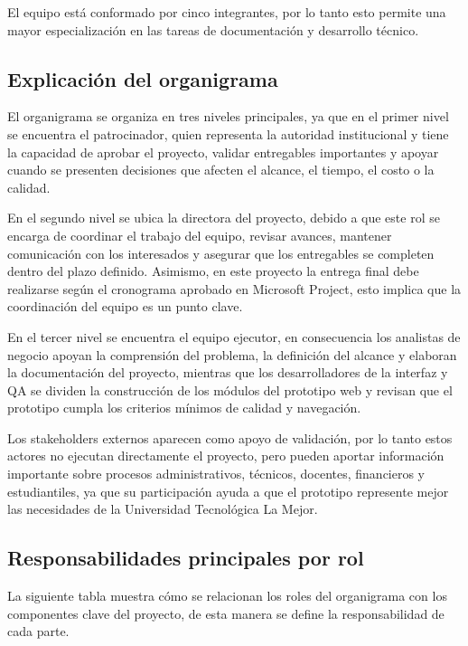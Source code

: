 \documentclass[11pt,spanish]{article}
\begin{document}
El equipo está conformado por cinco integrantes, por lo tanto esto permite una mayor especialización en las tareas de documentación y desarrollo técnico.

\subsection{Explicación del organigrama}

El organigrama se organiza en tres niveles principales, ya que en el primer nivel se encuentra el patrocinador, quien representa la autoridad institucional y tiene la capacidad de aprobar el proyecto, validar entregables importantes y apoyar cuando se presenten decisiones que afecten el alcance, el tiempo, el costo o la calidad.

En el segundo nivel se ubica la directora del proyecto, debido a que este rol se encarga de coordinar el trabajo del equipo, revisar avances, mantener comunicación con los interesados y asegurar que los entregables se completen dentro del plazo definido. Asimismo, en este proyecto la entrega final debe realizarse según el cronograma aprobado en Microsoft Project, esto implica que la coordinación del equipo es un punto clave.

En el tercer nivel se encuentra el equipo ejecutor, en consecuencia los analistas de negocio apoyan la comprensión del problema, la definición del alcance y elaboran la documentación del proyecto, mientras que los desarrolladores de la interfaz y QA se dividen la construcción de los módulos del prototipo web y revisan que el prototipo cumpla los criterios mínimos de calidad y navegación.

Los stakeholders externos aparecen como apoyo de validación, por lo tanto estos actores no ejecutan directamente el proyecto, pero pueden aportar información importante sobre procesos administrativos, técnicos, docentes, financieros y estudiantiles, ya que su participación ayuda a que el prototipo represente mejor las necesidades de la Universidad Tecnológica La Mejor.

\subsection{Responsabilidades principales por rol}

La siguiente tabla muestra cómo se relacionan los roles del organigrama con los componentes clave del proyecto, de esta manera se define la responsabilidad de cada parte.
\end{document}
